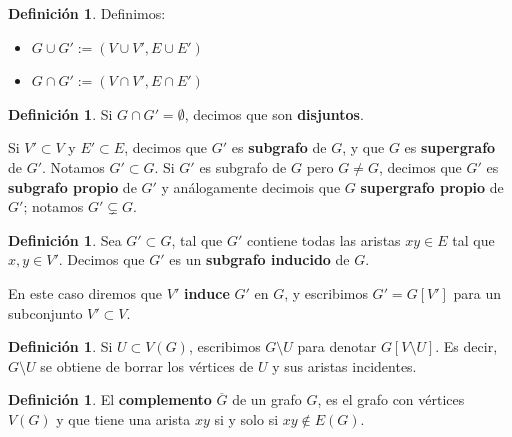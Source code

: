 \documentclass[12pt]{report}
\theoremstyle{plain}
\theoremstyle{definition}
\newtheorem{definition}[theorem]{Definición}
\renewcommand{\bar}[1]{\overline{#1}}
\begin{document}
\begin{definition}
Definimos:
\begin{itemize}
\item $G \cup G' := (V \cup V', E \cup E')$
\item $G \cap G' := (V \cap V' , E \cap E')$
\end{itemize}
\end{definition}


\begin{definition}
Si $G \cap G' = \emptyset$, decimos que son \textbf{disjuntos}.

Si $V' \subset V$ y $E' \subset E$, decimos que $G'$ es \textbf{subgrafo} de $G$, y que $G$ es \textbf{supergrafo} de $G'$. Notamos $G' \subset G$. Si $G'$ es subgrafo de $G$ pero $G \neq G$, decimos que $G'$ es \textbf{subgrafo propio} de $G'$ y análogamente decimois que $G$ \textbf{supergrafo propio} de $G'$; notamos $G' \subsetneq G$.
\end{definition}

\begin{definition}
Sea $G' \subset G$, tal que $G'$ contiene todas las aristas $xy \in E$ tal que $x,y \in V'$. Decimos que $G'$ es un \textbf{subgrafo inducido} de $G$.

En este caso diremos que $V'$ \textbf{induce} $G'$ en $G$, y escribimos $G' = G[V']$ para un subconjunto $V' \subset V$.
\end{definition}









\begin{definition}
Si $U \subset V(G)$, escribimos $G \setminus U$ para denotar $G[V \setminus U]$. Es decir, $G \setminus U$ se obtiene de borrar los vértices de $U$ y sus aristas incidentes.
\end{definition}


\begin{definition}
El \textbf{complemento} $\bar G$ de un grafo $G$, es el grafo con vértices $V(G)$ y que tiene una arista $xy$ si y solo si $xy \not \in E(G)$.
\end{definition}
\end{document}
